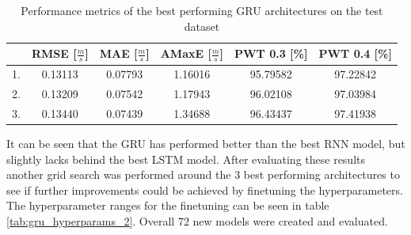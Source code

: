 \FloatBarrier
\begin{table}[h]
    \centering
    \begin{tabular}{|c|c|c|c|c|c|}
        \hline
          & \textbf{RMSE [$\frac{m}{s}$]} & \textbf{MAE [$\frac{m}{s}$]} & \textbf{AMaxE [$\frac{m}{s}$]} & \textbf{PWT 0.3 [\%]} & \textbf{PWT 0.4 [\%]} \\
        \hline \hline
        1. & 0.13113 & 0.07793 & 1.16016 & 95.79582 & 97.22842 \\
        \hline
        2. & 0.13209 & 0.07542 & 1.17943 & 96.02108 & 97.03984 \\
        \hline
        3. & 0.13440 & 0.07439 & 1.34688 & 96.43437 & 97.41938 \\
        \hline
    \end{tabular}
    \caption{Performance metrics of the best performing GRU architectures on the test dataset}
    \label{tab:gru_best_models_1_metrics}
\end{table}
\FloatBarrier

It can be seen that the GRU has performed better than the best RNN model, but slightly lacks behind the best LSTM model. After evaluating these results another grid search was performed around the 3 best performing architectures to see if further improvements could be achieved by finetuning the hyperparameters. The hyperparameter ranges for the finetuning can be seen in table \ref{tab:gru_hyperparams_2}. Overall 72 new models were created and evaluated.

